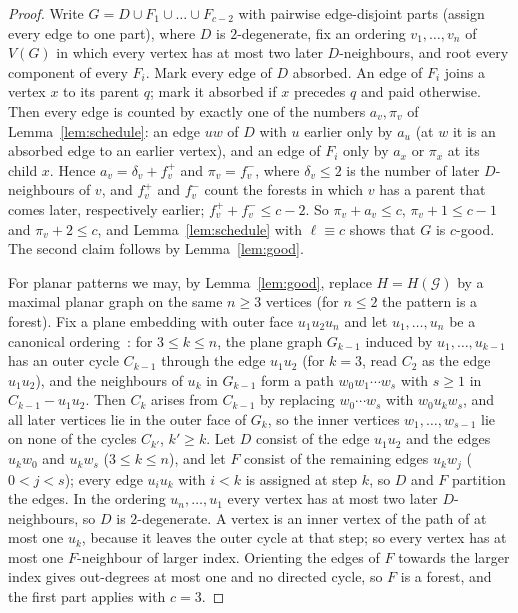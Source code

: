 \documentclass[11pt,letterpaper]{article}
\theoremstyle{definition}
\newcommand{\cG}{\mathcal{G}}
\begin{document}
\begin{proof}
Write $G=D\cup F_1\cup\dots\cup F_{c-2}$ with pairwise edge-disjoint parts (assign every edge to one
part), where $D$ is $2$-degenerate, fix an ordering $v_1,\dots,v_n$ of $V(G)$ in which every vertex
has at most two later $D$-neighbours, and root every component of every $F_i$. Mark every edge of $D$
absorbed. An edge of $F_i$ joins a vertex $x$ to its parent $q$; mark it absorbed if $x$ precedes $q$
and paid otherwise. Then every edge is counted by exactly one of the numbers $a_v,\pi_v$ of
Lemma~\ref{lem:schedule}: an edge $uw$ of $D$ with $u$ earlier only by $a_u$ (at $w$ it is an absorbed
edge to an earlier vertex), and an edge of $F_i$ only by $a_x$ or $\pi_x$ at its child $x$. Hence
$a_v=\delta_v+f_v^+$ and $\pi_v=f_v^-$, where $\delta_v\le2$ is the number of later $D$-neighbours of $v$,
and $f_v^+$ and $f_v^-$ count the forests in which $v$ has a parent that comes later, respectively
earlier; $f_v^++f_v^-\le c-2$. So $\pi_v+a_v\le c$, $\pi_v+1\le c-1$ and $\pi_v+2\le c$, and
Lemma~\ref{lem:schedule} with $\ell\equiv c$ shows that $G$ is $c$-good. The second claim follows by
Lemma~\ref{lem:good}.

For planar patterns we may, by Lemma~\ref{lem:good}, replace $H=H(\cG)$ by a maximal planar graph on
the same $n\ge3$ vertices (for $n\le2$ the pattern is a forest). Fix a plane embedding with outer face
$u_1u_2u_n$ and let $u_1,\dots,u_n$ be a canonical ordering~\cite{dFPP90}: for $3\le k\le n$, the plane
graph $G_{k-1}$ induced by $u_1,\dots,u_{k-1}$ has an outer cycle $C_{k-1}$ through the edge $u_1u_2$
(for $k=3$, read $C_2$ as the edge $u_1u_2$), and the neighbours of $u_k$ in $G_{k-1}$ form a path
$w_0w_1\cdots w_s$ with $s\ge1$ in $C_{k-1}-u_1u_2$. Then $C_k$ arises from $C_{k-1}$ by replacing
$w_0\cdots w_s$ with $w_0u_kw_s$, and all later vertices lie in the outer face of $G_k$, so the inner
vertices $w_1,\dots,w_{s-1}$ lie on none of the cycles $C_{k'}$, $k'\ge k$. Let $D$ consist of the edge
$u_1u_2$ and the edges $u_kw_0$ and $u_kw_s$ ($3\le k\le n$), and let $F$ consist of the remaining edges
$u_kw_j$ ($0<j<s$); every edge $u_iu_k$ with $i<k$ is assigned at step $k$, so $D$ and $F$ partition
the edges. In the ordering $u_n,\dots,u_1$ every vertex has at most two later $D$-neighbours, so $D$ is
$2$-degenerate. A vertex is an inner vertex of the path of at most one $u_k$, because it leaves the
outer cycle at that step; so every vertex has at most one $F$-neighbour of larger index. Orienting
the edges of $F$ towards the larger index gives out-degrees at most one and no directed cycle, so $F$
is a forest, and the first part applies with $c=3$.
\end{proof}
\end{document}
